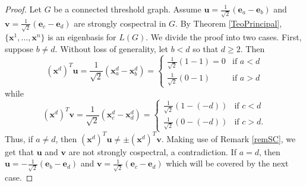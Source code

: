 \documentclass[preprint]{elsarticle}
\begin{document}
\begin{proof}
Let $G$ be a connected threshold graph. Assume $\mathbf{u}=\frac{1}{\sqrt2}(\mathbf{e}_a-\mathbf{e}_b)$ and $\mathbf{v}=\frac{1}{\sqrt2}(\mathbf{e}_c-\mathbf{e}_d)$ are strongly cospectral in $G$. By Theorem \ref{TeoPrincipal}, $\{\mathbf{x}^{1}, \ldots, \mathbf{x}^{n}\}$ is an eigenbasis for $L(G)$. We divide the proof into two cases. First, suppose $b\neq d$. Without loss of generality, let $b<d$ so that $d\geq 2$. Then 
\[
  (\mathbf{x}^{d})^T\mathbf{u}= \frac{1}{\sqrt{2}}(\mathbf{x}^{d}_a-\mathbf{x}^{d}_b)=
  \begin{cases}
    \frac{1}{\sqrt{2}}(1-1)=0 & \text{if $a<d$}\\
    \frac{1}{\sqrt2}(0-1) & \text{if $a>d$}
  \end{cases}
\]
while 
\[
  (\mathbf{x}^{d})^T\mathbf{v}= \frac{1}{\sqrt{2}}(\mathbf{x}^{d}_c-\mathbf{x}^{d}_d)=
  \begin{cases}
    \frac{1}{\sqrt{2}}(1-(-d)) & \text{if $c<d$}\\
    \frac{1}{\sqrt2}(0-(-d)) & \text{if $c>d$}.
  \end{cases}
\]
Thus, if $a\neq d$, then $(\mathbf{x}^{d})^T\mathbf{u}\neq\pm (\mathbf{x}^{d})^T\mathbf{v}$. Making use of Remark \ref{remSC}, we get that $\mathbf{u}$ and $\mathbf{v}$ are not strongly cospectral, a contradiction. %
If $a=d$, then $\mathbf{u}=-\frac{1}{\sqrt2}(\mathbf{e}_b-\mathbf{e}_d)$ and $\mathbf{v}=\frac{1}{\sqrt2}(\mathbf{e}_c-\mathbf{e}_d)$ which will be covered by the next case.


\end{proof}
\end{document}
